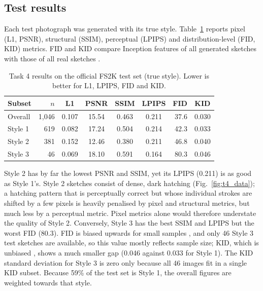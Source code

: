 \documentclass[conference]{IEEEtran}
\begin{document}
\subsection{Test results}
\label{sec:t4_results}
Each test photograph was generated with its true style. Table~\ref{tab:t4_test} reports pixel (L1, PSNR), structural (SSIM), perceptual (LPIPS) and distribution-level (FID, KID) metrics. FID and KID compare Inception features of all generated sketches with those of all real sketches \cite{heusel2017,binkowski2018}.

\begin{table}[t]
\centering
\caption{Task 4 results on the official FS2K test set (true style). Lower is better for L1, LPIPS, FID and KID.}
\label{tab:t4_test}
\footnotesize
\setlength{\tabcolsep}{3.5pt}
\begin{tabular}{@{}lrccccrc@{}}
\toprule
Subset & $n$ & L1 & PSNR & SSIM & LPIPS & FID & KID \\
\midrule
Overall & 1,046 & 0.107 & 15.54 & 0.463 & 0.211 & 37.6 & 0.030 \\
Style 1 & 619 & 0.082 & 17.24 & 0.504 & 0.214 & 42.3 & 0.033 \\
Style 2 & 381 & 0.152 & 12.46 & 0.380 & 0.211 & 46.8 & 0.040 \\
Style 3 & 46 & 0.069 & 18.10 & 0.591 & 0.164 & 80.3 & 0.046 \\
\bottomrule
\end{tabular}
\end{table}

Style 2 has by far the lowest PSNR and SSIM, yet its LPIPS (0.211) is as good as Style 1's. Style 2 sketches consist of dense, dark hatching (Fig.~\ref{fig:t4_data}); a hatching pattern that is perceptually correct but whose individual strokes are shifted by a few pixels is heavily penalised by pixel and structural metrics, but much less by a perceptual metric. Pixel metrics alone would therefore understate the quality of Style 2. Conversely, Style 3 has the best SSIM and LPIPS but the worst FID (80.3). FID is biased upwards for small samples \cite{chong2020}, and only 46 Style 3 test sketches are available, so this value mostly reflects sample size; KID, which is unbiased \cite{binkowski2018}, shows a much smaller gap (0.046 against 0.033 for Style 1). The KID standard deviation for Style 3 is zero only because all 46 images fit in a single KID subset. Because 59\% of the test set is Style 1, the overall figures are weighted towards that style.
\end{document}
